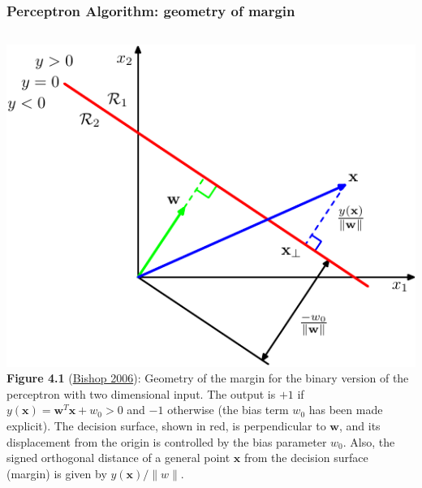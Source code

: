 \documentclass[ignorenonframetext,plain]{beamer}
\renewcommand{\vec}{\mathbf}
\begin{document}
\begin{frame}\frametitle{Perceptron Algorithm: geometry of margin}
\begin{columns}
\includegraphics[width=\textwidth]{images/bishop-fig-4-1.pdf}
\footnotesize {\bf Figure 4.1}
(\href{http://research.microsoft.com/en-us/um/people/cmbishop/prml}{Bishop
  2006}): Geometry of the margin for the binary version of the
perceptron with two dimensional input.  The output is $+1$ if
$y(\vec{x})=\vec{w}^T\vec{x}+w_0 > 0$ and $-1$ otherwise (the bias
term $w_0$ has been made explicit).  The decision surface, shown in
red, is perpendicular to $\vec{w}$, and its displacement from the
origin is controlled by the bias parameter $w_0$. Also, the signed
orthogonal distance of a general point $\vec{x}$ from the decision
surface (margin) is given by $y(\vec{x})/\|w\|$.
\end{columns}
\end{frame}
\end{document}
